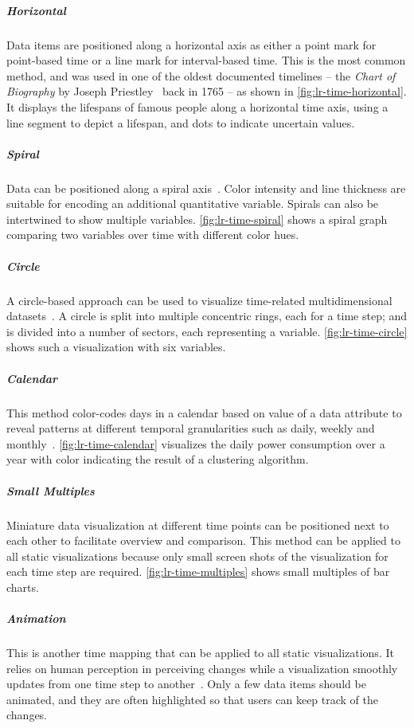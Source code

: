 \subparagraph{Horizontal} Data items are positioned along a horizontal axis as either a point mark for point-based time or a line mark for interval-based time. This is the most common method, and was used in one of the oldest documented timelines -- the \emph{Chart of Biography} by Joseph Priestley~\cite{Priestley1765} back in 1765 -- as shown in \autoref{fig:lr-time-horizontal}. It displays the lifespans of famous people along a horizontal time axis, using a line segment to depict a lifespan, and dots to indicate uncertain values.

\subparagraph{Spiral} Data can be positioned along a spiral axis~\cite{Weber2001}. Color intensity and line thickness are suitable for encoding an additional quantitative variable. Spirals can also be intertwined to show multiple variables. \autoref{fig:lr-time-spiral} shows a spiral graph comparing two variables over time with different color hues.

\subparagraph{Circle} A circle-based approach can be used to visualize time-related multidimensional datasets~\cite{Keim2004}. A circle is split into multiple concentric rings, each for a time step; and is divided into a number of sectors, each representing a variable. \autoref{fig:lr-time-circle} shows such a visualization with six variables.

\subparagraph{Calendar} This method color-codes days in a calendar based on value of a data attribute to reveal patterns at different temporal granularities such as daily, weekly and monthly~\cite{VanWijk1999}. \autoref{fig:lr-time-calendar} visualizes the daily power consumption over a year with color indicating the result of a clustering algorithm.

\subparagraph{Small Multiples}  Miniature data visualization at different time points can be positioned next to each other to facilitate overview and comparison. This method can be applied to all static visualizations because only small screen shots of the visualization for each time step are required. \autoref{fig:lr-time-multiples} shows small multiples of bar charts.

\subparagraph{Animation} This is another time mapping that can be applied to all static visualizations. It relies on human perception in perceiving changes while a visualization smoothly updates from one time step to another~\cite{Gapminder}. Only a few data items should be animated, and they are often highlighted so that users can keep track of the changes.

